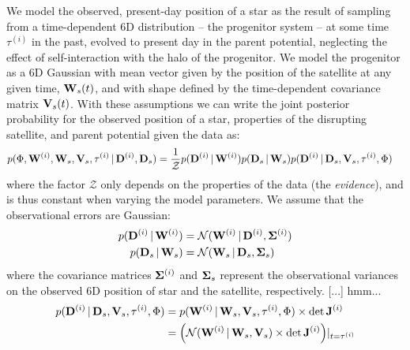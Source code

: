 \documentclass[letterpaper,12pt,preprint]{aastex}
\newcommand{\given}{\,|\,}
\newcommand{\D}{{\bf D}}
\newcommand{\W}{{\bf W}}
\newcommand{\V}{{\bf V}}
\newcommand{\bSigma}{{\bf \Sigma}}
\newcommand{\bsigma}{\boldsymbol\sigma}
\begin{document}
We model the observed, present-day position of a star as the result of sampling from a time-dependent 6D distribution -- the progenitor system -- at some time $\tau^{(i)}$ in the past, evolved to present day in the parent potential, neglecting the effect of self-interaction with the halo of the progenitor. We model the progenitor as a 6D Gaussian with mean vector given by the position of the satellite at any given time, ${\bf W}_s(t)$, and with shape defined by the time-dependent covariance matrix $\V_s(t)$. With these assumptions we can write the joint posterior probability for the observed position of a star, properties of the disrupting satellite, and parent potential given the data as:
\begin{align}
	p(\Phi, \W^{(i)}, \W_s, \V_s, \tau^{(i)} \given \D^{(i)}, \D_s) &= 
		\frac{1}{\mathcal{Z}} p(\D^{(i)} \given \W^{(i)}) p(\D_s \given \W_s) p(\D^{(i)} \given \D_s, \V_s, \tau^{(i)}, \Phi)
\end{align}
where the factor $\mathcal{Z}$ only depends on the properties of the data (the \emph{evidence}), and is thus constant when varying the model parameters. We assume that the observational errors are Gaussian:
\begin{align}
	p(\D^{(i)} \given \W^{(i)}) &= \mathcal{N}(\W^{(i)} \given \D^{(i)}, \bSigma^{(i)})\\
	p(\D_s \given \W_s) &= \mathcal{N}(\W_s \given \D_s, \bSigma_s)
\end{align}
where the covariance matrices $\bSigma^{(i)}$ and $\bSigma_s$ represent the observational variances on the observed 6D position of star and the satellite, respectively. [...] hmm...
\begin{align}
	p(\D^{(i)} \given \D_s, \V_s, \tau^{(i)}, \Phi) &= p(\W^{(i)} \given \W_s, \V_s, \tau^{(i)}, \Phi) \times \det{\bf J}^{(i)}\\
	&= \left(\mathcal{N}(\W^{(i)} \given \W_s, \V_s) \times \det{\bf J}^{(i)}\right)\rvert_{t=\tau^{(i)}}
\end{align}

\end{document}
